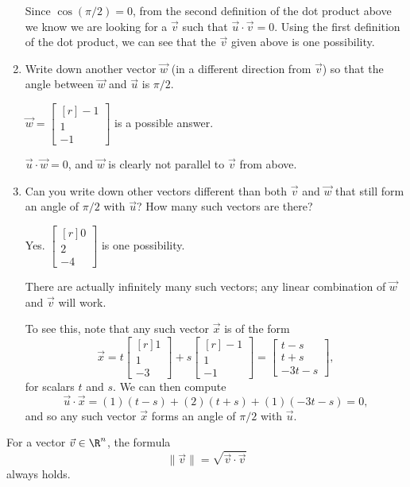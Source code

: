 \documentclass{problemset}
\newcommand{\mat}[1]{\begin{bmatrix*}[r]#1\end{bmatrix*}}
\newcommand{\matc}[1]{\begin{bmatrix}#1\end{bmatrix}}
\newcommand{\displayonlynewpage}{\begin{displayonly}\newpage\end{displayonly}}
\begin{document}
\begin{parts}
\begin{enumerate}
\begin{solution}
					Since $\cos(\pi/2) = 0$, from the second definition of the dot
					product above we know we are looking for a $\vec v$ such that
					$\vec u \cdot \vec v = 0$. Using the first definition of the
					dot product, we can see that the $\vec v$ given above is one
					possibility.
				\end{solution}
			\item Write down another vector $\vec w$ (in a different direction from
				$\vec v$) so that the angle between $\vec w$ and $\vec u$ is $\pi/2$.
				\begin{solution}
					$\vec w = \mat{-1\\1\\-1}$ is a possible answer.

					$\vec u \cdot \vec w = 0$, and $\vec w$ is clearly not parallel
					to $\vec v$ from above.
				\end{solution}
			\item Can you write down other vectors different than both $\vec v$
				and $\vec w$ that still	form an angle of $\pi/2$ with $\vec u$?
				How many such vectors are there?
				\begin{solution}
					Yes. $\mat{0\\2\\-4}$ is one possibility.

					There are actually infinitely many such vectors; any linear
					combination of $\vec w$ and $\vec v$ will work.

					To see this, note that any such vector $\vec x$ is of the form
					\[
						\vec x = t \mat{1\\1\\-3} + s \mat{-1\\1\\-1}
						= \matc{t-s\\t+s\\-3t-s},
					\]
					for scalars $t$ and $s$. We can then compute
					\[
						\vec u \cdot \vec x = (1)(t-s) + (2)(t+s) + (1)(-3t-s) = 0,
					\]
					and so any such vector $\vec x$ forms an angle of $\pi/2$
					with $\vec u$.
				\end{solution}
		\end{enumerate}
	\end{parts}

	\displayonlynewpage
	\begin{theorem}
		For a vector $\vec v\in \R^n$, the formula
		\[
			\|\vec v\| = \sqrt{\vec v\cdot \vec v}
		\]
		always holds.
	\end{theorem}
\end{document}

